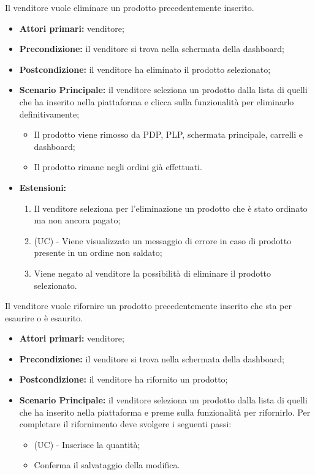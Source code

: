 Il venditore vuole eliminare un prodotto precedentemente inserito.
\begin{itemize}
    \item \textbf{Attori primari:} venditore;
    \item \textbf{Precondizione:} il venditore si trova nella schermata della dashboard;
    \item \textbf{Postcondizione:} il venditore ha eliminato il prodotto selezionato;
    \item \textbf{Scenario Principale:} il venditore seleziona un prodotto dalla lista di quelli che ha inserito nella piattaforma e clicca sulla funzionalità per eliminarlo definitivamente;
    \begin{itemize}
    	\item Il prodotto viene rimosso da PDP, PLP, schermata principale, carrelli e dashboard;
    	\item Il prodotto rimane negli ordini già effettuati.
    \end{itemize}
    \item \textbf{Estensioni:}
    \begin{enumerate}[label=\lett]
    	\item Il venditore seleziona per l'eliminazione un prodotto che è stato ordinato ma non ancora pagato;
    	\item (UC) - Viene visualizzato un messaggio di errore in caso di prodotto presente in un ordine non saldato;
    	\item Viene negato al venditore la possibilità di eliminare il prodotto selezionato.
    \end{enumerate}
\end{itemize}

Il venditore vuole rifornire un prodotto precedentemente inserito che sta per esaurire o è esaurito.
\begin{itemize}
    \item \textbf{Attori primari:} venditore;
    \item \textbf{Precondizione:} il venditore si trova nella schermata della dashboard;
    \item \textbf{Postcondizione:} il venditore ha rifornito un prodotto;
    \item \textbf{Scenario Principale:} il venditore seleziona un prodotto dalla lista di quelli che ha inserito nella piattaforma e preme sulla funzionalità per rifornirlo. Per completare il rifornimento deve svolgere i seguenti passi:
    \begin{itemize}
        \item (UC) - Inserisce la quantità;
        \item Conferma il salvataggio della modifica.
    \end{itemize}
\end{itemize}